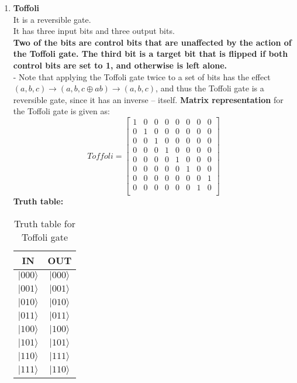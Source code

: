 \documentclass[12pt]{report}
\begin{document}
\begin{enumerate}
\item \textbf{Toffoli}\\
It is a reversible gate.\\
It has three input bits and three output bits. \\
\textbf{Two of the bits are control bits that are unaffected by the action of the Toffoli gate. The third bit is a target bit that is flipped if both control bits are set to 1, and otherwise is left alone. }\\
\hspace*{1cm} - Note that applying the Toffoli gate twice to a set of bits has the effect $(a, b, c) \to (a, b, c \oplus ab) \to (a, b, c)$, and thus the Toffoli gate is a reversible gate, since it has an inverse – itself.
\textbf{Matrix representation} for the Toffoli gate is given as:
\begin{equation*}
Toffoli = 
\begin{bmatrix} 
1& 0 & 0& 0 & 0 & 0& 0 & 0\\ 
0& 1 & 0& 0 & 0 & 0& 0 & 0\\
0& 0 & 1& 0 & 0 & 0& 0 & 0\\
0& 0 & 0& 1 & 0 & 0& 0 & 0\\
0& 0 & 0& 0 & 1 & 0& 0 & 0\\
0& 0 & 0& 0 & 0 & 1& 0 & 0\\
0& 0 & 0& 0 & 0 & 0& 0 & 1\\
0& 0 & 0& 0 & 0 & 0& 1 & 0\\
\end{bmatrix}
\end{equation*}
\textbf{Truth table:}\\
\begin{table}[h!]
\centering
\begin{tabular}{|c|c|}
\hline
IN & OUT\\
\hline
$|000\rangle$ & $|000\rangle$\\
\hline
$|001\rangle$ & $|001\rangle$\\
\hline
$|010\rangle$ & $|010\rangle$\\
\hline
$|011\rangle$ & $|011\rangle$\\
\hline
$|100\rangle$ & $|100\rangle$\\
\hline
$|101\rangle$ & $|101\rangle$\\
\hline
$|110\rangle$ & $|111\rangle$\\
\hline
$|111\rangle$ & $|110\rangle$\\
\hline
\end{tabular}
\caption{Truth table for Toffoli gate} 

\end{table}
\end{enumerate}
\end{document}
